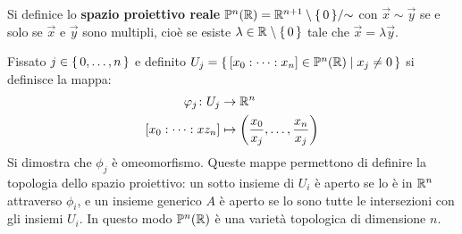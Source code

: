 \begin{definition}
  Si definice lo \textbf{spazio proiettivo reale}
  $ \mathbb{P}^{n} (\mathbb{R})= {\mathbb{R}^{n+1} \setminus \set{0}} \slash {\sim} $ con
  $ \vec{x} \sim \vec{y} $ se e solo se $ \vec{x} $ e $ \vec{y} $ sono multipli,
  cioè se esiste $ \lambda \in \mathbb{R}^{} \setminus \set{0} $ tale che $ \vec{x} = \lambda \vec{y} $.
\end{definition}
Fissato $ j \in \set{0, \dots, n} $ e definito
$ U_j = \set{[x_0 : \dots : x_n] \in \mathbb{P}^{n} (\mathbb{R}) | x_j \not = 0 } $ si definisce la mappa:
\begin{align*}
  \varphi_j \colon U_j & \to \mathbb{R}^{n} \\
  [x_0 : \dots : xz_n] & \mapsto \left(\frac{x_0}{x_j}, \dots, \frac{x_n}{x_j}\right)
\end{align*}
Si dimostra che $ \phi_j $ è omeomorfismo. Queste mappe permettono di definire la
topologia dello spazio proiettivo: un sotto insieme di $ U_i $ è aperto se lo è
in $ \mathbb{R}^{n} $ attraverso $ \phi_i $, e un insieme generico $ A $ è aperto se lo
sono tutte le intersezioni con gli insiemi $ U_i $. In questo modo $ \mathbb{P}^{n} (\mathbb{R}) $ è
una varietà topologica di dimensione $ n $.

